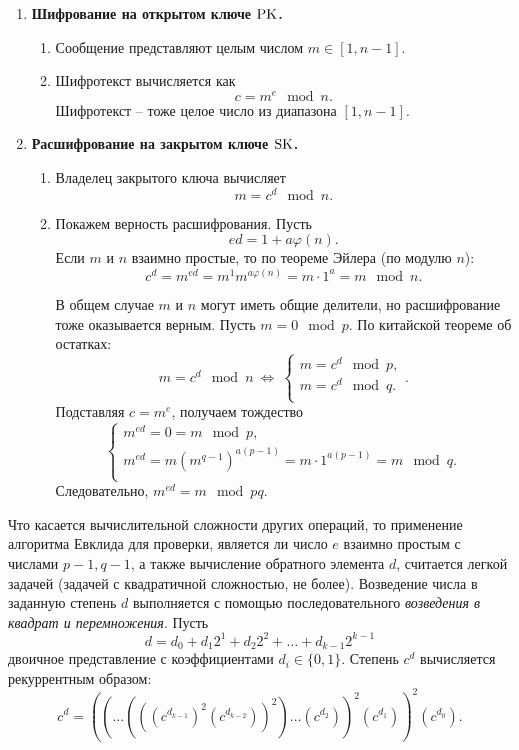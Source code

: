 \begin{enumerate}
    \item \textbf{Шифрование на открытом ключе $\textrm{PK}$.}
        \begin{enumerate}
            \item Сообщение представляют целым числом $m \in [1, n-1]$.
            \item Шифротекст вычисляется как
                \[ c = m^e \mod n. \]
                Шифротекст -- тоже целое число из диапазона $[1, n-1]$.
        \end{enumerate}
    \item \textbf{Расшифрование на закрытом ключе $\textrm{SK}$.}
        \begin{enumerate}
            \item Владелец закрытого ключа вычисляет
                \[ m = c^d \mod n. \]
            \item Покажем верность расшифрования. Пусть
                \[ ed = 1 + a \varphi(n). \]
                Если $m$ и $n$ взаимно простые, то по теореме Эйлера (по модулю $n$):
                \[ c^d = m ^{ed} = m^1 m^{a\varphi(n)} = m \cdot 1^a = m \mod n. \]

                В общем случае $m$ и $n$ могут иметь общие делители, но расшифрование тоже оказывается верным. Пусть $m = 0 \mod p$. По китайской теореме об остатках:
                \[
                     m = c^d \mod n ~\Leftrightarrow~
                     \left\{ \begin{array}{l}
                        m = c^d \mod p, \\
                        m = c^d \mod q. \\
                     \end{array} \right..
                \]
                Подставляя $c=m^e$, получаем тождество
                \[ \left\{ \begin{array}{l}
                    m^{ed} = 0 = m \mod p, \\
                    m^{ed} = m  \left( m^{q-1} \right)^{a(p-1)} = m \cdot 1^{a(p-1)} = m \mod q. \\
                \end{array} \right. \]
                Следовательно, $m^{ed} = m \mod pq$.
        \end{enumerate}
\end{enumerate}


Что касается вычислительной сложности других операций, то применение алгоритма Евклида для проверки, является ли число $e$  взаимно простым с числами $p-1, q-1$, а также вычисление обратного элемента $d$, считается легкой задачей (задачей с квадратичной сложностью, не более).
Возведение числа в заданную степень $d$ выполняется с помощью последовательного \emph{возведения в квадрат и перемножения}. Пусть
    \[ d = d_0 + d_1 2^1 + d_2 2^2 + \ldots + d_{k-1} 2^{k-1} \]
двоичное представление с коэффициентами $d_{i} \in \{ 0, 1 \}$. Степень $c^d$ вычисляется рекуррентным образом:
  \[ c^d =((... (((c^ {d_{k-1}})^2  (c^{d_{k-2}}))^2)\dots(c^{d_2}))^2 (c^{d_1}))^2 (c^{d_0}).\]

